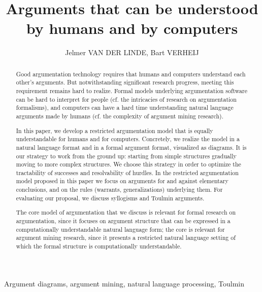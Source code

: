\documentclass{IOS-Book-Article}
\begin{document}
	\begin{frontmatter}

		\title{Arguments that can be understood \\by humans and by computers}

		\author{Jelmer VAN DER LINDE, Bart VERHEIJ}

		\address{Artificial Intelligence, University of Groningen}

		\begin{abstract}
	Good argumentation technology requires that humans and computers understand each other's arguments.
	But notwithstanding significant research progress, meeting this requirement remains hard to realize. Formal models underlying argumentation software can be hard to interpret for people (cf. the intricacies of research on argumentation formalisms), and computers can have a hard time understanding natural language arguments made by humans (cf. the complexity of argument mining research).

	In this paper, we develop a restricted argumentation model that is equally understandable for humans and for computers. Concretely, we realize the model in a natural language format and in a formal argument format, visualized as diagrams. It is our strategy to work from the ground up: starting from simple structures gradually moving to more complex structures. We choose this strategy in order to optimize the tractability of successes and resolvability of hurdles. In the restricted argumentation model proposed in this paper we focus on arguments for and against elementary conclusions, and on the rules (warrants, generalizations) underlying them. For evaluating our proposal, we discuss syllogisms and Toulmin arguments.

	The core model of argumentation that we discuss is relevant for formal research on argumentation, since it focuses on argument structure that can be expressed in a computationally understandable natural language form; the core is relevant for argument mining research, since it presents a restricted natural language setting of which the formal structure is computationally understandable.

		\end{abstract}

		\begin{keyword}
		Argument diagrams, argument mining, natural language processing, Toulmin
		\end{keyword}

	\end{frontmatter}
\end{document}
